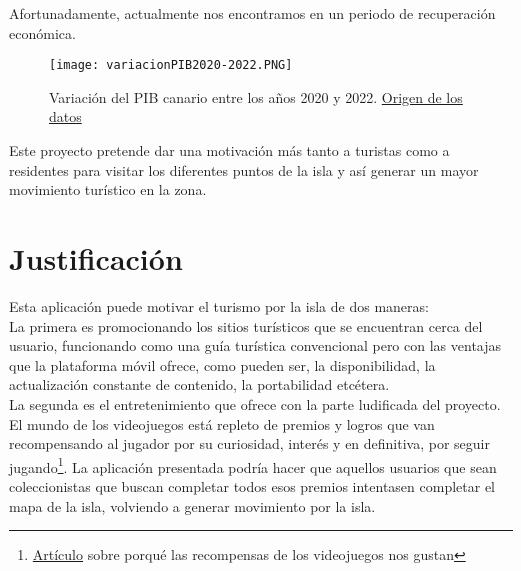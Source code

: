 \documentclass{report}
\begin{document}
Afortunadamente, actualmente nos encontramos en un periodo de recuperación económica. 
\begin{figure}[H]
    \centering
    \texttt{[image: variacionPIB2020-2022.PNG]}
    \caption{Variación del PIB canario entre los años 2020 y 2022. \href{https://oic.itccanarias.org/el-pib-interanual-se-redujo-en-canarias-un-198-frente-al-87-registrado-por-el-conjunto-de-espana/}{Origen de los datos}}
    \label{fig:mapaCompleto}
\end{figure}

Este proyecto pretende dar una motivación más tanto a turistas como a residentes para visitar los diferentes puntos de la isla y así generar un mayor movimiento turístico en la zona.



\section{Justificación}

Esta aplicación puede motivar el turismo por la isla de dos maneras:\\
La primera es promocionando los sitios turísticos que se encuentran cerca del usuario, funcionando como una guía turística convencional pero con las ventajas que la plataforma móvil ofrece, como pueden ser, la disponibilidad, la actualización constante de contenido, la portabilidad etcétera.\\

La segunda es el entretenimiento que ofrece con la parte ludificada del proyecto. El mundo de los videojuegos está repleto de premios y logros que van recompensando al jugador por su curiosidad, interés y en definitiva, por seguir jugando\footnote{\href{https://www.lavanguardia.com/estilos-de-vida/20120629/54317381414/por-que-enganchan-los-videojuegos.html}{Artículo} sobre porqué las recompensas de los videojuegos nos gustan}. La aplicación presentada podría hacer que aquellos usuarios que sean coleccionistas que buscan completar todos esos premios intentasen completar el mapa de la isla, volviendo a generar movimiento por la isla.\\
\end{document}
